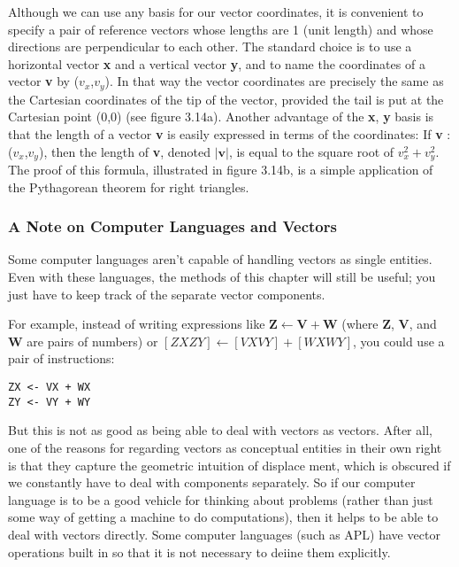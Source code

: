 \documentclass{book}
\begin{document}
Although we can use any basis for our vector coordinates, it is convenient to specify 
a pair of reference vectors whose lengths are 1 (unit length) and whose directions are 
perpendicular to each other. The standard choice is to use a horizontal vector \textbf{x} and a vertical vector \textbf{y}, and
to name the coordinates of a vector \textbf{v} by ($v_x$,$v_y$). In that way the 
vector coordinates are precisely the same as the Cartesian coordinates of
the tip of the vector, provided the tail is put at the Cartesian point
(0,0) (see figure 3.14a). Another advantage of the \textbf{x}, \textbf{y} basis is that the
length of a vector \textbf{v} is easily expressed in terms of the coordinates: If
\textbf{v} : ($v_x$,$v_y$), then the length of \textbf{v}, denoted $|\mathbf{v}|$, is equal to the square
root of $v_x^2 + v_y^2$. The proof of this formula, illustrated in figure 3.14b, is
a simple application of the Pythagorean theorem for right triangles.

\subsubsection{A Note on Computer Languages and Vectors}

Some computer languages aren't capable of handling vectors as single
entities. Even with these languages, the methods of this chapter will still
be useful; you just have to keep track of the separate vector components.

For example, instead of writing expressions like $\mathbf{Z} \leftarrow \mathbf{V} + \mathbf{W}$ (where \textbf{Z},
\textbf{V}, and \textbf{W} are pairs of numbers) or $[ZX ZY] \leftarrow [VX VY] + [WX WY]$, you
could use a pair of instructions:

\begin{verbatim}
ZX <- VX + WX
ZY <- VY + WY
\end{verbatim}
But this is not as good as being able to deal with vectors as vectors. After
all, one of the reasons for regarding vectors as conceptual entities in
their own right is that they capture the geometric intuition of displace
ment, which is obscured if we constantly have to deal with components
separately. So if our computer language is to be a good vehicle for thinking about problems (rather than just some way of getting a machine to
do computations), then it helps to be able to deal with vectors directly.
Some computer languages (such as APL) have vector operations built in
so that it is not necessary to deiine them explicitly.
\end{document}
